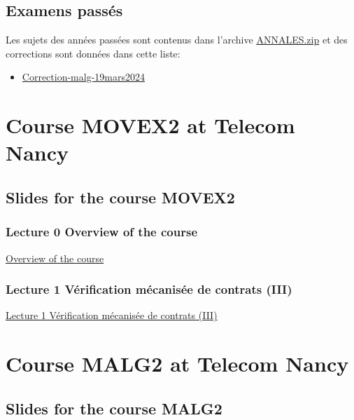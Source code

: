 \documentclass[ 12pt]{article}
\begin{document}
\subsection{Examens passés}
\label{sec:examens-passes}

Les sujets des années passées sont   contenus dans l'archive
\href{http://mery54.github.io/teaching/movex/lecturesnotes/ANNALES.zip}{ANNALES.zip}
et      des corrections sont données   dans cette liste:

\begin{itemize}
\item  \href{http://mery54.github.io/teaching/movex/lecturesnotes/Correction-malg-19mars2024.pdf}{Correction-malg-19mars2024}
\end{itemize}



\section{Course MOVEX2 at Telecom Nancy}
\label{sec:course-mcfsi-at}


\subsection{Slides for the course MOVEX2}
\label{sec:slides}


\subsubsection{Lecture 0  {Overview of the course }}
  
  \href{http://mery54.github.io/teaching/movex/lecturesnotes/movexlecture6.pdf}{Overview of the course }


   \subsubsection{Lecture 1 {Vérification  mécanisée de contrats} (III)}

   \href{http://mery54.github.io/teaching/movex/lecturesnotes/movexlecture7.pdf}{Lecture
     1  Vérification  mécanisée de contrats (III)}


\section{Course MALG2 at Telecom Nancy}
\label{sec:course-mcfsi-at}


\subsection{Slides for the course MALG2}
\label{sec:slides}
\end{document}
